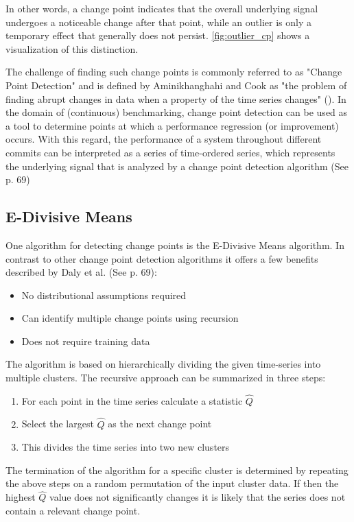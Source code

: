 \documentclass[	runningheads,
				a4paper]{llncs}
\begin{document}
	In other words, a change point indicates that the overall underlying signal undergoes a noticeable change after that point, while an outlier is only a temporary effect that generally does not persist. \autoref{fig:outlier_cp} shows a visualization of this distinction.

	The challenge of finding such change points is commonly referred to as "Change Point Detection" and is defined by Aminikhanghahi and Cook as "the problem of finding abrupt changes in data when a property of the time series changes" (\cite{Samaneh2016}). In the domain of (continuous) benchmarking, change point detection can be used as a tool to determine points at which a performance regression (or improvement) occurs. With this regard, the performance of a system throughout different commits can be interpreted as a series of time-ordered series, which represents the underlying signal that is analyzed by a change point detection algorithm (See \cite{daly2020} p. 69)

	\subsection{E-Divisive Means}
	\label{ssec:cp_edivisive}
	One algorithm for detecting change points is the E-Divisive Means algorithm. In contrast to other change point detection algorithms it offers a few benefits described by Daly et al. (See \cite{daly2020} p. 69):
	
	\begin{itemize}
		\item No distributional assumptions required
		\item Can identify multiple change points using recursion
		\item Does not require training data
	\end{itemize}

	The algorithm is based on hierarchically dividing the given time-series into multiple clusters. The recursive approach can be summarized in three steps:
	\begin{enumerate}
		\item For each point in the time series calculate a statistic $\hat{Q}$
		\item Select the largest $\hat{Q}$ as the next change point
		\item This divides the time series into two new clusters
	\end{enumerate}

	The termination of the algorithm for a specific cluster is determined by repeating the above steps on a random permutation of the input cluster data. If then the highest $\hat{Q}$ value does not significantly changes it is likely that the series does not contain a relevant change point.
\end{document}
